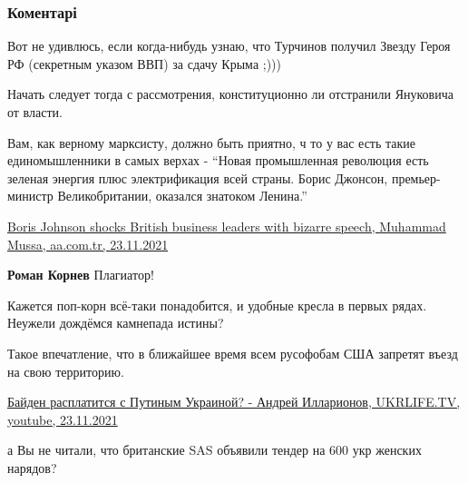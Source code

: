  
 
 
 
 
\subsubsection{Коментарі}
\label{sec:24_11_2021.fb.dzhangirov_dmitrij.kiev.1.maidan_evrosud.cmt}

\begin{itemize} %
Вот не удивлюсь, если когда-нибудь узнаю, что Турчинов получил Звезду Героя РФ (секретным указом ВВП) за сдачу Крыма ;)))

Начать следует тогда с рассмотрения, конституционно ли отстранили Януковича от власти.


Вам, как верному марксисту, должно быть приятно, ч то у вас есть такие
единомышленники в самых верхах - \enquote{Новая промышленная революция есть зеленая
энергия плюс электрификация всей страны. Борис Джонсон, премьер-министр
Великобритании, оказался знатоком Ленина.}

\href{https://www.aa.com.tr/en/europe/boris-johnson-shocks-british-business-leaders-with-bizarre-speech/2427877}{%
Boris Johnson shocks British business leaders with bizarre speech, Muhammad Mussa, aa.com.tr, 23.11.2021%
}

\textbf{Роман Корнев} Плагиатор!


Кажется поп-корн всё-таки понадобится, и удобные кресла в первых рядах. Неужели
дождёмся камнепада истины?


Такое впечатление, что в ближайшее время всем русофобам США запретят въезд на
свою территорию.

\href{https://youtu.be/n7yA-PgLppk}{%
Байден расплатится с Путиным Украиной? - Андрей Илларионов, UKRLIFE.TV, youtube, 23.11.2021%
}


а Вы не читали, что британские SAS объявили тендер на 600 укр женских нарядов?



\end{itemize}
